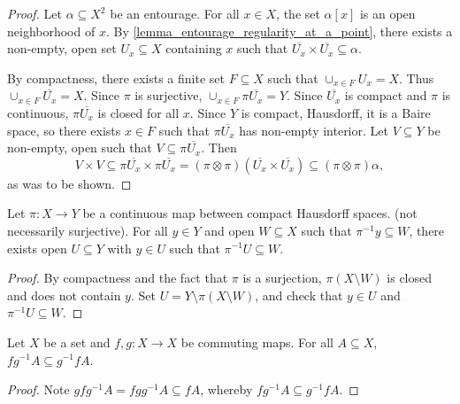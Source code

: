 \begin{proof}
\leanok{}
    Let $\alpha \subseteq X^2$ be an entourage.  For all $x \in X$, the set $\alpha[x]$ is an open neighborhood of $x$.  By \cref{lemma_entourage_regularity_at_a_point}, there exists a non-empty, open set $U_x \subseteq X$ containing $x$ such that $\overline{U_x} \times \overline{U_x} \subseteq \alpha$.

    By compactness, there exists a finite set $F \subseteq X$ such that $\cup_{x \in F} U_x = X$. Thus $\cup_{x \in F} \overline{U_x} = X$.  Since $\pi$ is surjective, $\cup_{x \in F} \pi \overline{U_x} = Y$. 
    Since $\overline{U_x}$ is compact and $\pi$ is continuous, $\pi \overline{U_x}$ is closed for all $x$.  Since $Y$ is compact, Hausdorff, it is a Baire space, so there exists $x \in F$ such that $\pi \overline{U_x}$ has non-empty interior.  Let $V \subseteq Y$ be non-empty, open such that $V \subseteq \pi \overline{U_x}$.  Then
    \[V \times V \subseteq \pi \overline{U_x} \times \pi \overline{U_x} = (\pi \otimes \pi) (\overline{U_x} \times \overline{U_x}) \subseteq (\pi \otimes \pi)\alpha,\]
    as was to be shown.
\end{proof}

\begin{lemma}
\label{lemma_open_nbhd_of_fiber_contains_open_preimage}
\leanok{}
    Let $\pi: X \to Y$ be a continuous map between compact Hausdorff spaces. (not necessarily surjective).  For all $y \in Y$ and open $W \subseteq X$ such that $\pi^{-1} y \subseteq W$, there exists open $U \subseteq Y$ with $y \in U$ such that $\pi^{-1} U \subseteq W$.
\end{lemma}

\begin{proof}
\leanok{}
    By compactness and the fact that $\pi$ is a surjection, $\pi (X \setminus W)$ is closed and does not contain $y$.  Set $U = Y \setminus \pi(X \setminus W)$, and check that $y \in U$ and $\pi^{-1} U \subseteq W$.
\end{proof}

\begin{lemma}
    \label{lemma_commuting_map_algebra}
    Let $X$ be a set and $f, g : X \to X$ be commuting maps.  For all $A \subseteq X$, $f g^{-1} A \subseteq g^{-1} f A$.
\end{lemma}

\begin{proof}
    Note $g f g^{-1} A = f g g^{-1} A \subseteq f A$, whereby $f g^{-1} A \subseteq g^{-1} f A$.
\end{proof}

